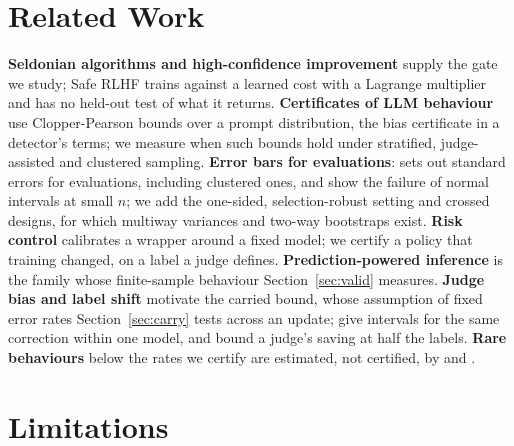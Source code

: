 \documentclass[letterpaper]{article} %
\begin{document}
\section{Related Work}

\textbf{Seldonian algorithms and high-confidence improvement} \citep{thomas2015hcope,thomas2015hcpi,thomas2019preventing,metevier2019,giguere2022}
supply the gate we study; Safe RLHF \citep{dai2024saferlhf} trains against a learned cost with a Lagrange multiplier and
has no held-out test of what it returns. \textbf{Certificates of LLM behaviour} \citep{chaudhary2024knowledge,chaudhary2025bias}
use Clopper-Pearson bounds over a prompt distribution, the bias certificate in a detector's terms; we measure when such
bounds hold under stratified, judge-assisted and clustered sampling. \textbf{Error bars for evaluations}:
\citet{miller2024errorbars} sets out standard errors for evaluations, including clustered ones, and
\citet{bowyer2025clt} show the failure of normal intervals at small $n$; we add the one-sided, selection-robust setting and crossed designs,
for which multiway variances \citep{cameron2011multiway} and two-way bootstraps \citep{owen2007pigeonhole,menzel2021bootstrap}
exist. \textbf{Risk control} \citep{bates2021rcps,angelopoulos2024crc,angelopoulos2025ltt,zollo2024prc} calibrates a
wrapper around a fixed model; we certify a policy that training changed, on a label a judge defines.
\textbf{Prediction-powered inference} \citep{angelopoulos2023ppi,angelopoulos2023ppipp,fisch2024stratppi,zrnic2024ppboot,boyeau2025autoeval,zrnic2024active,gligoric2025cdi}
is the family whose finite-sample behaviour Section~\ref{sec:valid} measures. \textbf{Judge bias and label shift}
\citep{zheng2023judge,souly2024strongreject,saerens2002,lipton2018} motivate the carried bound, whose assumption of fixed
error rates Section~\ref{sec:carry} tests across an update; \citet{lee2025judge} give intervals for the same correction within one model, and \citet{dorner2025limits} bound a judge's saving at half the labels. \textbf{Rare behaviours} below the rates we certify are
estimated, not certified, by \citet{wu2025rare} and \citet{jones2025forecasting}.

\section{Limitations}
\end{document}

